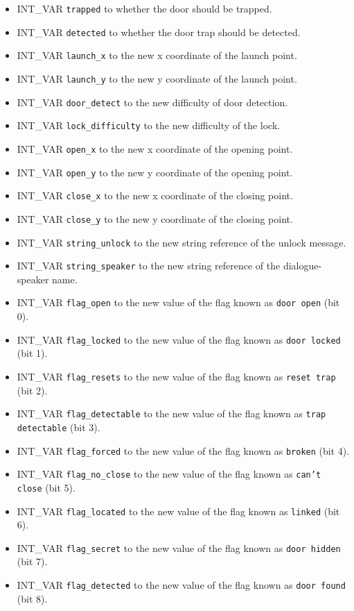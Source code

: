 \documentclass{article}
\def\t#1{{\tt #1}}
\begin{document}
\begin{itemize}
\item INT_VAR \verb+trapped+ to whether the door should be trapped.
\item INT_VAR \verb+detected+ to whether the door trap should be detected.
\item INT_VAR \verb+launch_x+ to the new x coordinate of the launch point.
\item INT_VAR \verb+launch_y+ to the new y coordinate of the launch point.
\item INT_VAR \verb+door_detect+ to the new difficulty of door detection.
\item INT_VAR \verb+lock_difficulty+ to the new difficulty of the lock.
\item INT_VAR \verb+open_x+ to the new x coordinate of the opening point.
\item INT_VAR \verb+open_y+ to the new y coordinate of the opening point.
\item INT_VAR \verb+close_x+ to the new x coordinate of the closing point.
\item INT_VAR \verb+close_y+ to the new y coordinate of the closing point.
\item INT_VAR \verb+string_unlock+ to the new string reference of the unlock message.
\item INT_VAR \verb+string_speaker+ to the new string reference of the dialogue-speaker name.
\item INT_VAR \verb+flag_open+ to the new value of the flag known as \t{door open} (bit 0).
\item INT_VAR \verb+flag_locked+ to the new value of the flag known as \t{door locked} (bit 1).
\item INT_VAR \verb+flag_resets+ to the new value of the flag known as \t{reset trap} (bit 2).
\item INT_VAR \verb+flag_detectable+ to the new value of the flag known as \t{trap detectable} (bit 3).
\item INT_VAR \verb+flag_forced+ to the new value of the flag known as \t{broken} (bit 4).
\item INT_VAR \verb+flag_no_close+ to the new value of the flag known as \t{can't close} (bit 5).
\item INT_VAR \verb+flag_located+ to the new value of the flag known as \t{linked} (bit 6).
\item INT_VAR \verb+flag_secret+ to the new value of the flag known as \t{door hidden} (bit 7).
\item INT_VAR \verb+flag_detected+ to the new value of the flag known as \t{door found} (bit 8).

\end{itemize}
\end{document}
